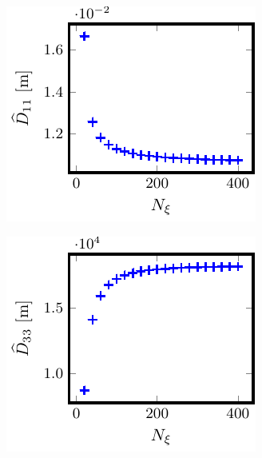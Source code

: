 \documentclass[10pt]{iopart}
\begin{document}
\begin{figure}[t]
	\centering
	\begin{subfigure}[t]{0.32\textwidth}
		\includegraphics{Convergence-Legendre-CIEMAT-QI-s0250-Er-0-D11}
%		
		\caption{}
		\label{subfig:D11_convergence_Legendre_CIEMAT_QI_0250_Erho_0}
	\end{subfigure}
	\begin{subfigure}[t]{0.32\textwidth}
		\includegraphics{Convergence-Legendre-CIEMAT-QI-s0250-Er-0-D33}
%		
		\caption{}
		\label{subfig:D33_convergence_Legendre_CIEMAT_QI_0250_Erho_0}
	\end{subfigure}
	
	
	

\end{figure}
\end{document}
